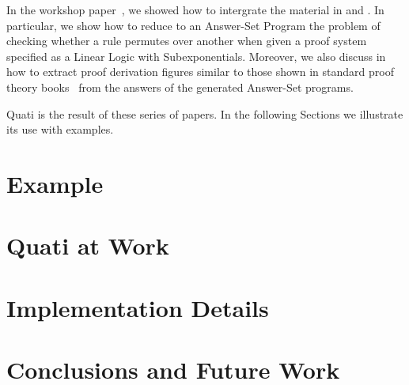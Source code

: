 \documentclass{llncs}
\begin{document}
In the workshop paper~\cite{nigam14ebl}, we showed how to intergrate the material in \cite{nigam13iclp} and \cite{nigam.jlc}.
In particular, we show how to reduce to an Answer-Set Program the problem of checking whether a rule permutes over another when given 
a proof system specified as a Linear Logic with Subexponentials. Moreover, we also discuss in \cite{nigam14ebl} how to extract proof derivation 
figures similar to those shown in standard proof theory books~\cite{troelstra} from the 
answers of the generated Answer-Set programs. 

Quati is the result of these series of papers. In the following Sections we illustrate its use 
with examples.

\section{Example}


\section{Quati at Work}

\section{Implementation Details}

\section{Conclusions and Future Work}


% 
% 
\end{document}
